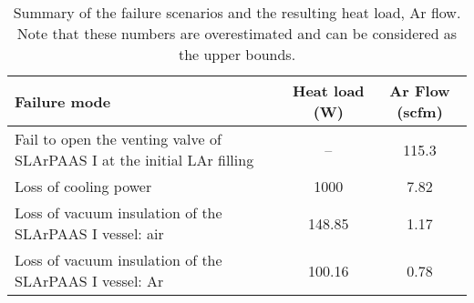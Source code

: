 \begin{table}[h]
\begin{center}
\tabcolsep=10pt
\begin{tabular}{m{8cm}|c|c}
\hline
\hline
Failure mode & Heat load (W) & Ar Flow (scfm) \\
\hline
Fail to open the venting valve of SLArPAAS I at the initial LAr filling & -- & 115.3 \\
Loss of cooling power & 1000 & 7.82 \\
Loss of vacuum insulation of the SLArPAAS I vessel: air & 148.85 & 1.17 \\
Loss of vacuum insulation of the SLArPAAS I vessel: Ar & 100.16 & 0.78 \\
\hline
\hline
\end{tabular}
\caption{Summary of the failure scenarios and the resulting heat load, Ar flow.
Note that these numbers are overestimated and can be considered as the upper bounds.}
\label{table:discharge_summary}
\end{center}
\end{table}
